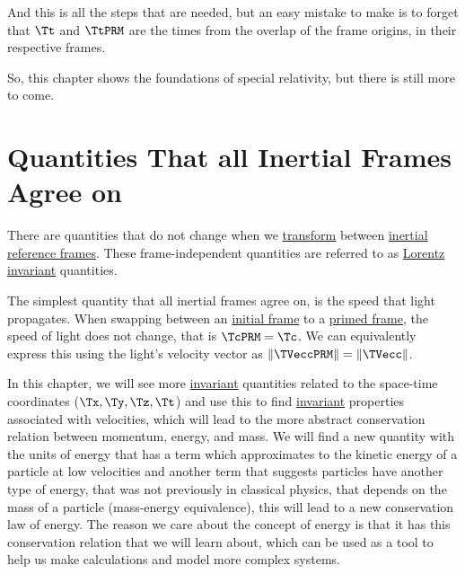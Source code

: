 And this is all the steps that are needed, but an easy mistake to make is to forget that ${\Tt }$ and $\TtPRM $ are the times from the overlap of the frame origins, in their respective frames.

So, this chapter shows the foundations of special relativity, but there is still more to come.

%

\printbibliography[segment=\therefsegment, heading=subbibliography]

\chapter{Quantities That all Inertial Frames Agree on} \label{ch: Invariant Quantities}

There are quantities that do not change when we \hyperlink{def-transform}{transform} between \hyperlink{def-Inertial-reference-frame}{inertial reference frames}.
These frame-independent quantities are referred to as \hyperlink{def-lorentz-invariant}{Lorentz invariant} quantities.

The simplest quantity that all inertial frames agree on, is the speed that light propagates.
When swapping between an \hyperlink{def-initial-Frame}{initial frame} to a \hyperlink{def-Primed-Frame}{primed frame}, the speed of light does not change, that is $\TcPRM =\Tc $.
We can equivalently express this using the light's velocity vector as $\|\TVeccPRM \|=\|\TVecc \|$.

In this chapter, we will see more \hyperlink{def-lorentz-invariant}{invariant} quantities related to the space-time coordinates ($\Tx ,\Ty ,\Tz ,\Tt $) and use this to find \hyperlink{def-lorentz-invariant}{invariant} properties associated with velocities, which will lead to the more abstract conservation relation between momentum, energy, and mass.
We will find a new quantity with the units of energy that has a term which approximates to the kinetic energy of a particle at low velocities and another term that suggests particles have another type of energy, that was not previously in classical physics, that depends on the mass of a particle (mass-energy equivalence), this will lead to a new conservation law of energy.
The reason we care about the concept of energy is that it has this conservation relation that we will learn about, which can be used as a tool to help us make calculations and model more complex systems.

